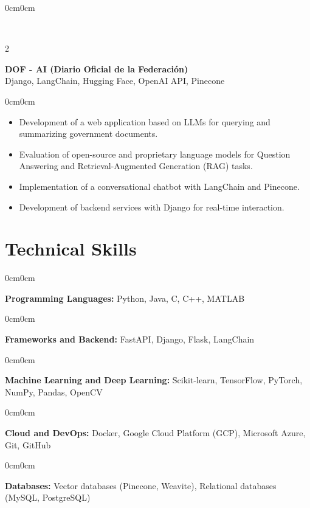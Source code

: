 \documentclass[10pt, letterpaper]{article}
\newenvironment{highlights}{
	\begin{itemize}[topsep=0pt,itemsep=1pt,leftmargin=10pt]
	}{
	\end{itemize}
}
\newenvironment{onecolentry}{
	\begin{adjustwidth}{0cm}{0cm}
	}{
	\end{adjustwidth}
	\vspace{0pt}
}
\newenvironment{twocolentry}[1]{
	\onecolentry
	\columnratio{0.75} 
	\begin{paracol}{2}
		\raggedright #1
		\switchcolumn
	}{
	\end{paracol}
	\endonecolentry
}
\begin{document}
	\begin{twocolentry}
		{\textbf{DOF - AI (Diario Oficial de la Federación)}\\
		Django, LangChain, Hugging Face, OpenAI API, Pinecone}
	\end{twocolentry}
	
	\begin{onecolentry}
		\begin{highlights}
			\item Development of a web application based on LLMs for querying and summarizing government documents.
			\item Evaluation of open-source and proprietary language models for Question Answering and Retrieval-Augmented Generation (RAG) tasks.
			\item Implementation of a conversational chatbot with LangChain and Pinecone.
			\item Development of backend services with Django for real-time interaction.
		\end{highlights}
	\end{onecolentry}
	
	
	\section{Technical Skills}
	
	\begin{onecolentry}
		\textbf{Programming Languages:} Python, Java, C, C++, MATLAB
	\end{onecolentry}
	
	\begin{onecolentry}
		\textbf{Frameworks and Backend:} FastAPI, Django, Flask, LangChain
	\end{onecolentry}
	
	\begin{onecolentry}
		\textbf{Machine Learning and Deep Learning:} Scikit-learn, TensorFlow, PyTorch, NumPy, Pandas, OpenCV
	\end{onecolentry}
	
	\begin{onecolentry}
		\textbf{Cloud and DevOps:} Docker, Google Cloud Platform (GCP), Microsoft Azure, Git, GitHub
	\end{onecolentry}
	
	\begin{onecolentry}
		\textbf{Databases:} Vector databases (Pinecone, Weavite), Relational databases (MySQL, PostgreSQL)
	\end{onecolentry}
	
\end{document}
